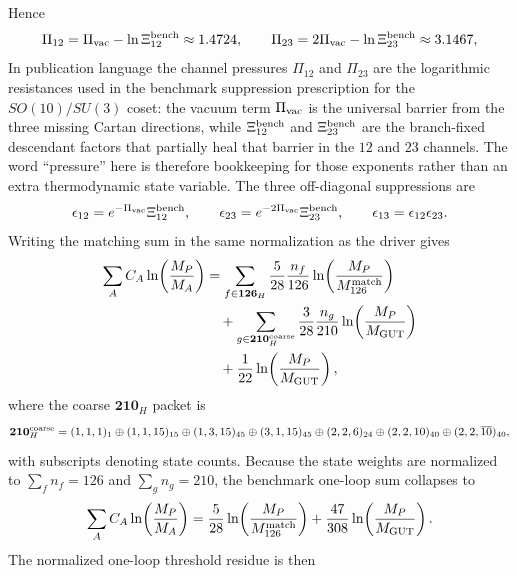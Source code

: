 \documentclass[11pt]{article}
\begin{document}
Hence
\begin{equation}
 \Pi_{12}=\Pi_{\rm vac}-\ln\Xi_{12}^{\rm bench}\approx 1.4724,
 \qquad
 \Pi_{23}=2\Pi_{\rm vac}-\ln\Xi_{23}^{\rm bench}\approx 3.1467,
\end{equation}
In publication language the channel pressures $\Pi_{12}$ and $\Pi_{23}$ are the
logarithmic resistances used in the benchmark suppression prescription for the
$SO(10)/SU(3)$ coset: the vacuum term $\Pi_{\rm vac}$ is the universal barrier
from the three missing Cartan directions, while $\Xi_{12}^{\rm bench}$ and
$\Xi_{23}^{\rm bench}$ are the branch-fixed descendant factors that partially
heal that barrier in the $12$ and $23$ channels. The word ``pressure'' here is
therefore bookkeeping for those exponents rather than an extra thermodynamic
state variable. The three off-diagonal suppressions are
\begin{equation}
 \epsilon_{12}=e^{-\Pi_{\rm vac}}\Xi_{12}^{\rm bench},
 \qquad
 \epsilon_{23}=e^{-2\Pi_{\rm vac}}\Xi_{23}^{\rm bench},
 \qquad
 \epsilon_{13}=\epsilon_{12}\epsilon_{23}.
\end{equation}
Writing the matching sum in the same normalization as the driver gives
\begin{align}
 \sum_A C_A\ln\!\left(\frac{M_P}{M_A}\right)
 &=
 \sum_{f\in\mathbf{126}_H}
 \frac{5}{28}\frac{n_f}{126}
 \ln\!\left(\frac{M_P}{M_{126}^{\rm match}}\right)
 \notag\\
 &\quad+
 \sum_{g\in\mathbf{210}_H^{\rm coarse}}
 \frac{3}{28}\frac{n_g}{210}
 \ln\!\left(\frac{M_P}{M_{\rm GUT}}\right)
 \notag\\
 &\quad+
 \frac{1}{22}\ln\!\left(\frac{M_P}{M_{\rm GUT}}\right),
 \label{eq:s12-threshold-matching-sum}
\end{align}
where the coarse $\mathbf{210}_H$ packet is
\begin{equation}
 \mathbf{210}_H^{\rm coarse}
 =
 (1,1,1)_{1}\oplus(1,1,15)_{15}\oplus(1,3,15)_{45}\oplus(3,1,15)_{45}\oplus(2,2,6)_{24}\oplus(2,2,10)_{40}\oplus(2,2,\overline{10})_{40},
\end{equation}
with subscripts denoting state counts. Because the state weights are normalized
to $\sum_f n_f=126$ and $\sum_g n_g=210$, the benchmark one-loop sum collapses to
\begin{equation}
 \sum_A C_A\ln\!\left(\frac{M_P}{M_A}\right)
 =
 \frac{5}{28}\ln\!\left(\frac{M_P}{M_{126}^{\rm match}}\right)
 +
 \frac{47}{308}\ln\!\left(\frac{M_P}{M_{\rm GUT}}\right).
\end{equation}
The normalized one-loop threshold residue is then
\end{document}
